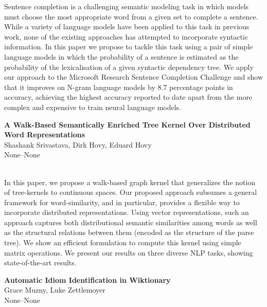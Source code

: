\documentclass[twoside,makeidx]{book}
\renewcommand{\normalsize}{\fontsize{8}{9}\selectfont}
\renewcommand{\small}{\fontsize{7}{8}\selectfont}
\begin{document}
\nopagebreak%
\noindent%
{\small Sentence completion is a challenging semantic modeling task in which models must choose the most appropriate word from a given set to complete a sentence. While a variety of language models have been applied to this task in previous work, none of the existing approaches has attempted to incorporate syntactic information. In this paper we propose to tackle this task using a pair of simple language models in which the probability of a sentence is estimated as the probability of the lexicalisation of a given syntactic dependency tree. We apply our approach to the Microsoft Research Sentence Completion Challenge and show that it improves on N-gram language models by 8.7 percentage points in accuracy, achieving the highest accuracy reported to date apart from the more complex and expensive to train neural language models.}
\par\vspace{2em}\noindent%
\begin{minipage}{\linewidth}%
\begin{center}
\textbf{\normalsize A Walk-Based Semantically Enriched Tree Kernel Over Distributed Word Representations}\\
\normalsize  Shashank Srivastava,  Dirk Hovy,  Eduard Hovy\\
{\small None--None}\\
\end{center}
\end{minipage}\\[0.5em]
\nopagebreak%
\noindent%
{\small In this paper, we propose a walk-based graph kernel that generalizes the notion of tree-kernels to continuous spaces. Our proposed approach subsumes a general framework for word-similarity, and in particular, provides a flexible way to incorporate distributed representations. Using vector representations, such an approach captures both distributional semantic similarities among words as well as the structural relations between them (encoded as the structure of the parse tree). We show an efficient formulation to compute this kernel using simple matrix operations. We present our results on three diverse NLP tasks, showing state-of-the-art results.}
\par\vspace{2em}\noindent%
\begin{minipage}{\linewidth}%
\begin{center}
\textbf{\normalsize Automatic Idiom Identification in Wiktionary}\\
\normalsize  Grace Muzny,  Luke Zettlemoyer\\
{\small None--None}\\
\end{center}
\end{minipage}\\[0.5em]
\end{document}

